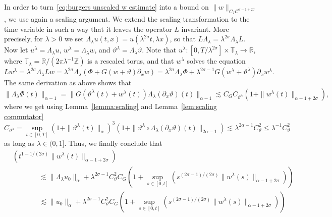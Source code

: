 \documentclass[a4paper,11pt]{article}
\theoremstyle{remark}
\newcommand{\R}{\mathbb{R}}
\newcommand{\Z}{\mathbb{Z}}
\newcommand{\CC}{\ensuremath{\mathscr{C}}}
\newcommand{\reso}{\,\mathord{\circ}\,}
\begin{document}
In order to turn~\eqref{eq:burgers unscaled w estimate} into a bound on $\| w \|_{C_{T} \CC^{\alpha -1+2 \sigma}}$, we use again a scaling argument. We extend the scaling
transformation to the time variable in such a way that it leaves the operator
$L$ invariant. More precisely, for $\lambda >0$ we set $\Lambda_{\lambda} u (t,x ) =u ( \lambda^{2 \sigma} t, \lambda x )$, so that $L  \Lambda_{\lambda} =\lambda^{2 \sigma} \Lambda_{\lambda} L$. Now let $u^{\lambda} =\Lambda_{\lambda} u$, $w^{\lambda} = \Lambda_{\lambda} w$, and
$\vartheta^{\lambda} = \Lambda_{\lambda} \vartheta$. Note that $u^{\lambda} \colon [ 0,T/ \lambda^{2 \sigma} ] \times \mathbb{T}_{\lambda} \rightarrow \mathbb{R}$, where $\mathbb{T}_{\lambda} = \R / (2\pi\lambda^{-1}\Z)$ is a
rescaled torus, and that $w^{\lambda}$ solves the equation
\[
   L w^{\lambda} = \lambda^{2 \sigma} \Lambda_{\lambda} L w= \lambda^{2 \sigma} \Lambda_{\lambda} ( \Phi +G ( w+ \vartheta ) \partial_{x} w ) = \lambda^{2 \sigma} \Lambda_{\lambda} \Phi + \lambda^{2 \sigma -1} G ( w^{\lambda} + \vartheta^{\lambda} ) \partial_{x} w^{\lambda}.
\]
The same derivation as above shows that
\[
   \| \Lambda_{\lambda} \Phi ( t ) \|_{\alpha -1} = \| G(\vartheta^\lambda(t) + w^\lambda(t)) \Lambda_\lambda (\partial_x \vartheta)(t) \|_{\alpha -1} \lesssim C_{G} C_{\vartheta^{\lambda}} ( 1+ \| w^{\lambda} ( t ) \|_{\alpha -1+2 \sigma} ),
\]
where we get using Lemma~\ref{lemma:scaling} and Lemma~\ref{lem:scaling commutator}
\[
   C_{\vartheta^{\lambda}} = \sup_{t \in [ 0,T ]} ( 1+ \| \vartheta^{\lambda} ( t ) \|_{\alpha} )^{3} ( 1+ \| \vartheta^\lambda \reso \Lambda_\lambda (\partial_{x} \vartheta) (t) \|_{2 \alpha -1} ) \lesssim \lambda^{2 \alpha -1} C^2_{\vartheta} \leqslant \lambda^{-1} C^2_{\vartheta}
\]
as long as $\lambda \in ( 0,1 ]$. Thus, we finally conclude that
\begin{align*}
   &( t^{1-1/ ( 2 \sigma )} \| w^{\lambda} ( t ) \|_{\alpha -1+2 \sigma} ) \\
   &\hspace{45pt} \lesssim \| \Lambda_{\lambda} u_{0} \|_{\alpha} + \lambda^{2 \sigma -1} C^2_{\vartheta} C_{G} ( 1+ \sup_{s \in [ 0,t ]} ( s^{( 2 \sigma -1 ) / ( 2\sigma )} \| w^{\lambda} ( s ) \|_{\alpha -1+2 \sigma} ) ) \\
   &\hspace{45pt} \lesssim \| u_{0} \|_{\alpha} + \lambda^{2 \sigma -1} C^2_{\vartheta} C_{G} ( 1+ \sup_{s \in [ 0,t ]} ( s^{( 2 \sigma -1 ) / ( 2 \sigma )} \| w^{\lambda} ( s ) \|_{\alpha -1+2 \sigma} ) )
\end{align*}
\end{document}
